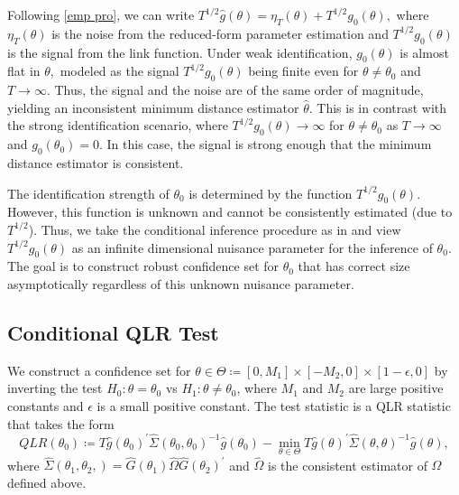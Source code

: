 \documentclass[11pt, letterpaper, twoside]{article}
\begin{document}
Following \cref{emp pro}, we can write $T^{1/2}\widehat{g}(\theta )=\eta _{T}(\theta )+T^{1/2}g_{0}(\theta ),$ where $\eta _{T}(\theta )$ is the noise from the reduced-form parameter estimation and $T^{1/2}g_{0}(\theta )$ is the signal from the link function. Under weak identification, $ g_{0}(\theta )$ is almost flat in $\theta ,$ modeled as the signal $ T^{1/2}g_{0}(\theta )$ being finite even for $\theta \neq \theta _{0}$ and $T\rightarrow \infty .$ Thus, the signal and the noise are of the same order of magnitude, yielding an inconsistent minimum distance estimator $ \widehat{\theta }.$ This is in contrast with the strong identification scenario, where $T^{1/2}g_{0}(\theta )\rightarrow \infty $ for $\theta \neq \theta _{0}$ as $T\rightarrow \infty $ and $g_{0}(\theta _{0})=0.$ In this case, the signal is strong enough that the minimum distance estimator is consistent.

The identification strength of $\theta _{0}$ is determined by the function $ T^{1/2}g_{0}(\theta ).$ However, this function is unknown and cannot be consistently estimated (due to $T^{1/2}$). Thus, we take the conditional inference procedure as in \textcite{andrews2016conditional} and view $ T^{1/2}g_{0}(\theta )$ as an infinite dimensional nuisance parameter for the inference of $\theta _{0}$. The goal is to construct robust confidence set for $\theta _{0}$ that has correct size asymptotically regardless of this unknown nuisance parameter.

\subsection{Conditional QLR Test}\label{sec:conditional QLR}

We construct a confidence set for $\theta \in \Theta \coloneqq [0, M_1] \times [-M_2, 0] \times [1 - \epsilon, 0]$ by inverting the test $ H_{0}: \theta =\theta_{0}$ vs $H_{1}: \theta \neq \theta _{0}$, where $M_1$ and $M_2$ are large positive constants and $\epsilon$ is a small positive constant. The test statistic is a QLR statistic that takes the form
%
\begin{equation}
    QLR(\theta _{0}) \coloneqq T\widehat{g}(\theta _{0})^{\prime }\widehat{\Sigma} (\theta _{0},\theta _{0})^{-1}\widehat{g}(\theta _{0})-\underset{\theta \in \Theta }{\min }T\widehat{g}(\theta )^{\prime }\widehat{\Sigma } (\theta ,\theta )^{-1}\widehat{g}(\theta ),  
    \label{QLR stat}
\end{equation}
%
where $\widehat{\Sigma }(\theta _{1},\theta _{2},)=\widehat{G}(\theta _{1})\widehat{\Omega }\widehat{G}(\theta _{2})^{\prime }$ and $\widehat{ \Omega }$ is the consistent estimator of $\Omega $ defined above.
\end{document}
